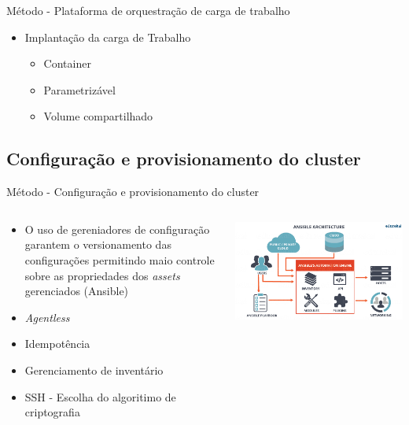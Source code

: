 \documentclass[10pt,brazil]{beamer}
\theoremstyle{definition}
\begin{document}
\begin{frame}{Método - Plataforma de orquestração de carga de trabalho}
  \begin{itemize}
    \item Implantação da carga de Trabalho
          \begin{itemize}
            \item Container
            \item Parametrizável
            \item Volume compartilhado
          \end{itemize}
  \end{itemize}
\end{frame}

\subsection{Configuração e provisionamento do cluster}

\begin{frame}{Método - Configuração e provisionamento do cluster}
  \begin{columns}
    \begin{column}{0.5\textwidth}
      \begin{itemize}
        \item[] O uso de gereniadores de configuração garantem o versionamento das configurações permitindo maio controle sobre as propriedades dos \emph{assets} gerenciados (Ansible\textregistered)
        \item \emph{Agentless}
        \item Idempotência
        \item Gerenciamento de inventário
        \item SSH - Escolha do algoritimo de criptografia %
      \end{itemize}
    \end{column}
    \begin{column}{0.5\textwidth}
      \includegraphics[width=1\textwidth]{ansible arch.png}
    \end{column}
  \end{columns}
\end{frame}
\end{document}

